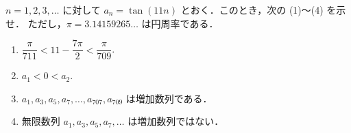 \documentclass[../../main.tex]{subfiles}
\begin{document}
$n=1,2,3,\dots$ に対して $a_n = \tan(11n)$ とおく．このとき，次の (1)～(4) を示せ．
ただし，$\pi = 3.14159265\dots$ は円周率である．

\begin{enumerate}
  \item $\dfrac{\pi}{711} < 11 - \dfrac{7\pi}{2} < \dfrac{\pi}{709}$.
  \item $a_1 < 0 < a_2$.
  \item $a_1, a_3, a_5, a_7, \dots, a_{707}, a_{709}$ は増加数列である．
  \item 無限数列 $a_1, a_3, a_5, a_7, \dots$ は増加数列ではない．
\end{enumerate}
\end{document}
